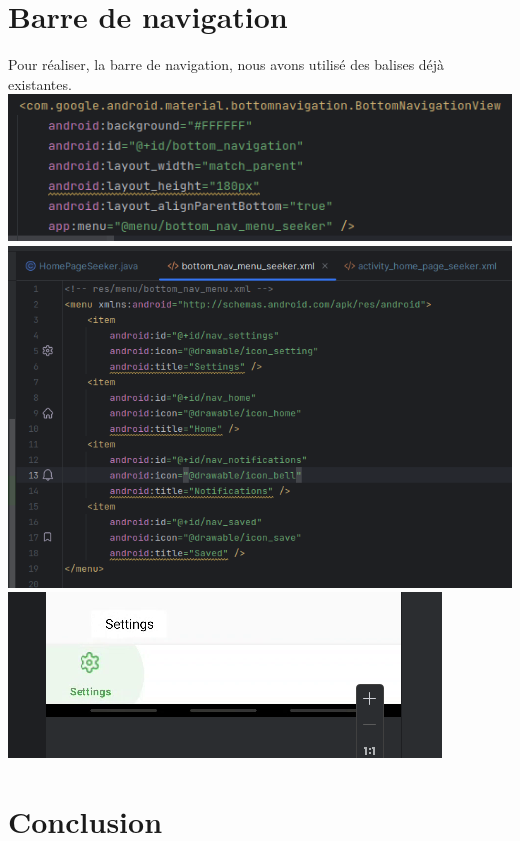 \documentclass[a4paper]{article}
\begin{document}
\begin{multicols}{2}
        \section{Barre de navigation}
            Pour réaliser, la barre de navigation, nous avons utilisé des balises déjà existantes.
            \noindent\includegraphics[width=.49\textwidth]{xmlNavBarA}
            \noindent\includegraphics[width=.49\textwidth]{xmlNavBarB}
            \noindent\includegraphics[width=.49\textwidth]{navBar}

                
        \section{Conclusion}
    \end{multicols}
\end{document}
